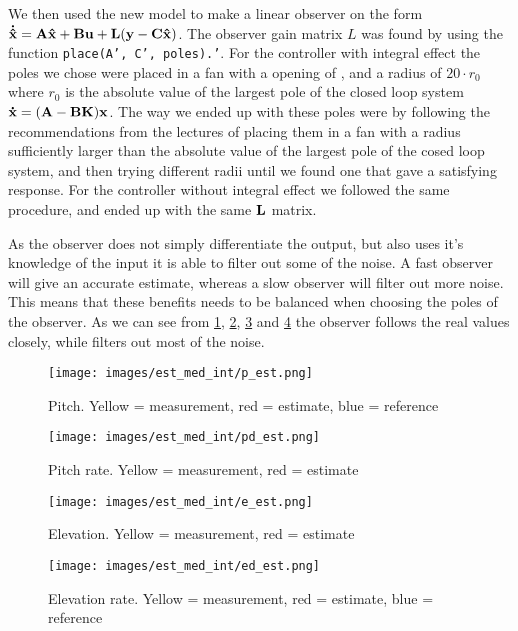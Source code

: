 We then used the new model to make a linear observer on the form $\mathbf{\dot{\hat x}} = \mathbf{A}\mathbf{\hat x} + \mathbf{B}\mathbf{u} + \mathbf{L} (\mathbf{y}-\mathbf{C}\mathbf{\hat x})$. The observer gain matrix $L$ was found by using the function \texttt{place(A', C', poles).'}. For the controller with integral effect the poles we chose were placed in a fan with a opening of , and a radius of $20 \cdot r_0$ where $r_0$ is the absolute value of the largest pole of the closed loop system $\mathbf{\dot x} = (\mathbf{A} - \mathbf{B} \mathbf{K}) \mathbf{x}$. The way we ended up with these poles were by following the recommendations from the lectures of placing them in a fan with a radius sufficiently larger than the absolute value of the largest pole of the cosed loop system, and then trying different radii until we found one that gave a satisfying response. For the controller without integral effect we followed the same procedure, and ended up with the same $\mathbf{L}$ matrix.  


As the observer does not simply differentiate the output, but also uses it's knowledge of the input it is able to filter out some of the noise. A fast observer will give an accurate estimate, whereas a slow observer will filter out more noise. This means that these benefits needs to be balanced when choosing the poles of the observer. As we can see from \cref{fig:pest}, \cref{fig:pdest}, \cref{fig:eest} and \cref{fig:edest} the observer follows the real values closely, while filters out most of the noise.

\begin{figure}[H]
	\centering
	\texttt{[image: images/est\_med\_int/p\_est.png]}
	\caption{Pitch. Yellow = measurement, red = estimate, blue = reference}
	\label{fig:pest}
\end{figure}
\begin{figure}[H]
	\centering
	\texttt{[image: images/est\_med\_int/pd\_est.png]}
	\caption{Pitch rate. Yellow = measurement, red = estimate}
	\label{fig:pdest}
\end{figure}
\begin{figure}[H]
	\centering
	\texttt{[image: images/est\_med\_int/e\_est.png]}
	\caption{Elevation. Yellow = measurement, red = estimate}
	\label{fig:eest}
\end{figure}
\begin{figure}[H]
	\centering
	\texttt{[image: images/est\_med\_int/ed\_est.png]}
	\caption{Elevation rate. Yellow = measurement, red = estimate, blue = reference}
	\label{fig:edest}
\end{figure}



